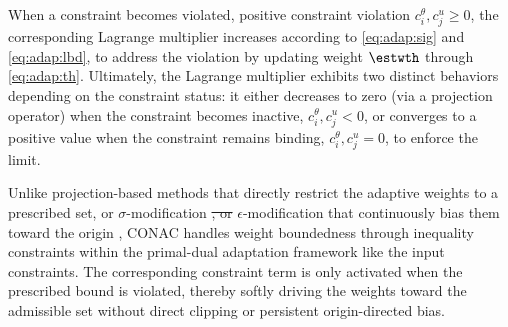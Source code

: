 \documentclass[letterpaper, journal]{IEEEtran}
\providecommand{\DIFadd}[1]{{\protect\color{blue}\uwave{#1}}} %
\providecommand{\DIFdel}[1]{{\protect\color{red}\sout{#1}}} %
\providecommand{\DIFaddbegin}{} %
\providecommand{\DIFaddend}{} %
\providecommand{\DIFdelbegin}{} %
\providecommand{\DIFdelend}{} %
\begin{document}
When a constraint becomes violated, \ie positive constraint violation \DIFdelbegin \DIFdel{$c^{\theta}_{i},c^{u}_{j}\ge0$}\DIFdelend \DIFaddbegin \DIFadd{$c^{\theta}_{i},c^{u}_{j}>0$}\DIFaddend , the corresponding Lagrange multiplier increases according to \eqref{eq:adap:sig} and \eqref{eq:adap:lbd}, to address the violation by updating weight $\estwth$ through \eqref{eq:adap:th}.
Ultimately, the Lagrange multiplier exhibits two distinct behaviors depending on the constraint status: it either decreases to zero (\eg via a projection operator) when the constraint becomes inactive, $c^{\theta}_i,c^{u}_j < 0$, or converges to a positive value when the constraint remains binding, $c^{\theta}_i,c^{u}_j = 0$, to enforce the limit.

\begin{remark} \label{rem:weight:bound}
  Unlike projection-based methods that directly restrict the adaptive weights to a prescribed set, or $\sigma$-modification \DIFdelbegin \DIFdel{, or }\DIFdelend \DIFaddbegin \DIFadd{and }\DIFaddend $\epsilon$-modification that continuously bias them toward the origin \cite{Ryu:2025ab}, CONAC handles weight boundedness through inequality constraints within the primal-dual adaptation framework like the input constraints.
  The corresponding constraint term is only activated when the prescribed bound is violated, thereby softly driving the weights toward the admissible set without direct clipping or persistent origin-directed bias.
\end{remark}
\end{document}
